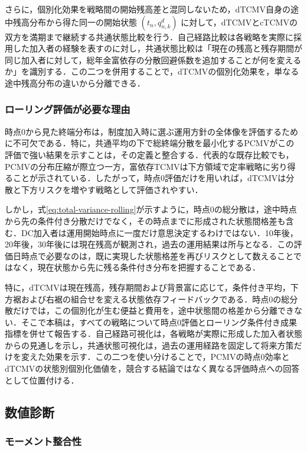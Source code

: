 \documentclass[10pt,a4paper]{article}
\theoremstyle{plain}
\theoremstyle{definition}
\begin{document}
さらに，個別化効果を戦略間の開始残高差と混同しないため，dTCMV自身の途中残高分布から得た同一の開始状態 $(t_n,q_{n,k}^{d})$ に対して，dTCMVとcTCMVの双方を満期まで継続する共通状態比較を行う．自己経路比較は各戦略を実際に採用した加入者の経験を表すのに対し，共通状態比較は「現在の残高と残存期間が同じ加入者に対して，総年金富依存の分散回避係数を追加することが何を変えるか」を識別する．この二つを併用することで，dTCMVの個別化効果を，単なる途中残高分布の違いから分離できる．

\subsubsection{ローリング評価が必要な理由}

時点0から見た終端分布は，制度加入時に選ぶ運用方針の全体像を評価するために不可欠である．特に，共通平均の下で総終端分散を最小化するPCMVがこの評価で強い結果を示すことは，その定義と整合する．代表的な既存比較でも，PCMVの分布圧縮が際立つ一方，富依存TCMVは下方領域で定率戦略に劣り得ることが示されている\citep{vanStadenDangForsyth2021}．したがって，時点0評価だけを用いれば，dTCMVは分散と下方リスクを増やす戦略として評価されやすい．

しかし，式\eqref{eq:total-variance-rolling}が示すように，時点0の総分散は，途中時点から先の条件付き分散だけでなく，その時点までに形成された状態間格差も含む．DC加入者は運用開始時点に一度だけ意思決定するわけではない．10年後，20年後，30年後には現在残高が観測され，過去の運用結果は所与となる．この評価日時点で必要なのは，既に実現した状態格差を再びリスクとして数えることではなく，現在状態から先に残る条件付き分布を把握することである．

特に，dTCMVは現在残高，残存期間および背景富に応じて，条件付き平均，下方裾および右裾の組合せを変える状態依存フィードバックである．時点0の総分散だけでは，この個別化が生む便益と費用を，途中状態間の格差から分離できない．そこで本稿は，すべての戦略について時点0評価とローリング条件付き成果指標を併せて報告する．自己経路可視化は，各戦略が実際に形成した加入者状態からの見通しを示し，共通状態可視化は，過去の運用経路を固定して将来方策だけを変えた効果を示す．この二つを使い分けることで，PCMVの時点0効率とdTCMVの状態別個別化価値を，競合する結論ではなく異なる評価時点への回答として位置付ける．

\subsection{数値診断}
\label{sec:diagnostics}

\subsubsection{モーメント整合性}
\end{document}
